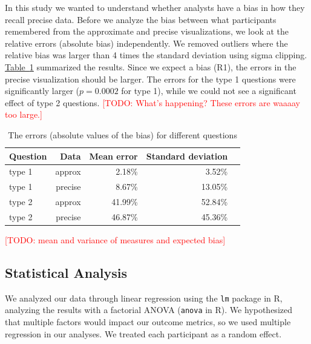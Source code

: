 \documentclass[10pt,journal,compsoc]{IEEEtran}
\newcommand{\tabref}[1]{\hyperref[#1]{Table~\ref*{#1}}}
\newcommand{\note}[2]{\textcolor{#1}{[#2]}}
\newcommand{\todo}[1]{\note{red}{TODO: #1}}
\begin{document}
In this study we wanted to understand whether analysts have a bias in how they recall precise data.
Before we analyze the bias between what participants remembered from the approximate and precise visualizations, we look at the relative errors (absolute bias) independently.
We removed outliers where the relative bias was larger than 4 times the standard deviation using sigma clipping.
\tabref{table_errors} summarized the results.
Since we expect a bias (R1), the errors in the precise visualization should be larger.
The errors for the type 1 questions were significantly larger ($p=0.0002$ for type 1), while we could not see a significant effect of type 2 questions.  \todo{What's happening? These errors are waaaay too large.}

\begin{table}[!t]
\renewcommand{\arraystretch}{1.3}
\caption{The errors (absolute values of the bias) for different questions}
\label{table_errors}
\centering
\begin{tabular}{|l||r|r|r|r|}
\hline
Question & Data        & Mean error & Standard deviation \\ \hline
\hline
type 1   & approx      & 2.18\%     & 3.52\%             \\ \hline
type 1   & precise     & 8.67\%     & 13.05\%            \\ \hline
type 2   & approx      & 41.99\%    & 52.84\%            \\ \hline
type 2   & precise     & 46.87\%    & 45.36\%            \\ \hline
\end{tabular}
\end{table}

\todo{mean and variance of measures and expected bias}

\subsection{Statistical Analysis}

We analyzed our data through linear regression using the \texttt{lm} package in R, analyzing the results with a factorial ANOVA (\texttt{anova} in R).
We hypothesized that multiple factors would impact our outcome metrics, so we used multiple regression in our analyses.
We treated each participant as a random effect.
\end{document}
